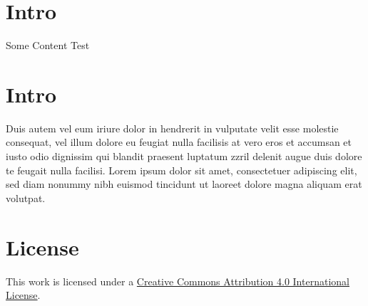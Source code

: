 \documentclass[12pt,a4paper,twocolumn]{article}
\begin{document}

	\section{Intro}
	Some Content \cite{Author:Year:Abbr:1111111}
	Test

	\section{Intro}
	Duis autem vel eum iriure dolor in hendrerit in vulputate velit esse molestie consequat, vel illum dolore eu feugiat nulla facilisis at vero eros et accumsan et iusto odio dignissim qui blandit praesent luptatum zzril delenit augue duis dolore te feugait nulla facilisi. Lorem ipsum dolor sit amet, consectetuer adipiscing elit, sed diam nonummy nibh euismod tincidunt ut laoreet dolore magna aliquam erat volutpat.

	
	

	\section*{License}
	\ccby\thinspace\thinspace This work is licensed under a \href{https://creativecommons.org/licenses/by/4.0/}{Creative Commons Attribution 4.0 International License}.
\end{document}
